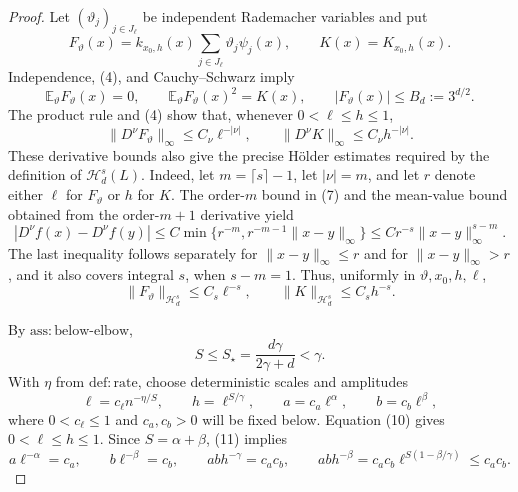 \documentclass{article}
\begin{document}
\begin{proof}
Let \((\vartheta_j)_{j\in J_\ell}\) be independent Rademacher variables and put
\[
 F_\vartheta(x)=k_{x_0,h}(x)\sum_{j\in J_\ell}\vartheta_j\psi_j(x),
 \qquad K(x)=K_{x_0,h}(x).                                      \tag{5}
\]
Independence, (4), and Cauchy--Schwarz imply
\[
 \mathbb E_\vartheta F_\vartheta(x)=0,
 \qquad
 \mathbb E_\vartheta F_\vartheta(x)^2=K(x),
 \qquad
 |F_\vartheta(x)|\le B_d:=3^{d/2}.                              \tag{6}
\]
The product rule and (4) show that, whenever \(0<\ell\le h\le1\),
\[
 \lVert D^\nu F_\vartheta\rVert_\infty\le C_\nu\ell^{-|\nu|},
 \qquad
 \lVert D^\nu K\rVert_\infty\le C_\nu h^{-|\nu|}.            \tag{7}
\]
These derivative bounds also give the precise H\"older estimates required by the definition of \(\mathcal H_d^s(L)\).  Indeed, let \(m=\lceil s\rceil-1\), let \(|\nu|=m\), and let \(r\) denote either \(\ell\) for \(F_\vartheta\) or \(h\) for \(K\).  The order-\(m\) bound in (7) and the mean-value bound obtained from the order-\(m+1\) derivative yield
\[
 |D^\nu f(x)-D^\nu f(y)|
 \le C\min\{r^{-m},r^{-m-1}\lVert x-y\rVert_\infty\}
 \le Cr^{-s}\lVert x-y\rVert_\infty^{s-m}.                    \tag{8}
\]
The last inequality follows separately for \(\lVert x-y\rVert_\infty\le r\) and for \(\lVert x-y\rVert_\infty>r\), and it also covers integral \(s\), when \(s-m=1\).  Thus, uniformly in \(\vartheta,x_0,h,\ell\),
\[
 \lVert F_\vartheta\rVert_{\mathcal H_d^s}\le C_s\ell^{-s},
 \qquad
 \lVert K\rVert_{\mathcal H_d^s}\le C_sh^{-s}.                \tag{9}
\]

By \(\mathrm{ass:below\mbox{-}elbow}\),
\[
 S\le S_\star=\frac{d\gamma}{2\gamma+d}<\gamma.               \tag{10}
\]
With \(\eta\) from \(\mathrm{def:rate}\), choose deterministic scales and amplitudes
\[
 \ell=c_\ell n^{-\eta/S},
 \qquad h=\ell^{S/\gamma},
 \qquad a=c_a\ell^\alpha,
 \qquad b=c_b\ell^\beta,                                      \tag{11}
\]
where \(0<c_\ell\le1\) and \(c_a,c_b>0\) will be fixed below.  Equation (10) gives \(0<\ell\le h\le1\).  Since \(S=\alpha+\beta\), (11) implies
\[
 a\ell^{-\alpha}=c_a,
 \qquad b\ell^{-\beta}=c_b,
 \qquad ab h^{-\gamma}=c_ac_b,
 \qquad ab h^{-\beta}
 =c_ac_b\ell^{S(1-\beta/\gamma)}\le c_ac_b.                    \tag{12}
\]


\end{proof}
\end{document}
